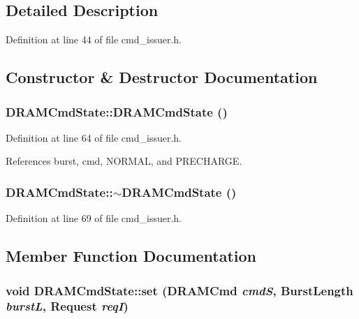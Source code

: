 \subsection{Detailed Description}


Definition at line 44 of file cmd\_\-issuer.h.

\subsection{Constructor \& Destructor Documentation}
\subsubsection[{DRAMCmdState}]{\setlength{\rightskip}{0pt plus 5cm}DRAMCmdState::DRAMCmdState ()\hspace{0.3cm}{\tt  [inline]}}\label{structDRAMCmdState_940294d20ed946530cb2731041c78a40}




Definition at line 64 of file cmd\_\-issuer.h.

References burst, cmd, NORMAL, and PRECHARGE.
\subsubsection[{$\sim$DRAMCmdState}]{\setlength{\rightskip}{0pt plus 5cm}DRAMCmdState::$\sim$DRAMCmdState ()\hspace{0.3cm}{\tt  [inline]}}\label{structDRAMCmdState_ad2f74b8d98b2ed4799d06fb137da995}




Definition at line 69 of file cmd\_\-issuer.h.

\subsection{Member Function Documentation}
\subsubsection[{set}]{\setlength{\rightskip}{0pt plus 5cm}void DRAMCmdState::set ({\bf DRAMCmd} {\em cmdS}, \/  {\bf BurstLength} {\em burstL}, \/  {\bf Request} {\em reqI})\hspace{0.3cm}{\tt  [inline]}}\label{structDRAMCmdState_901fee4ee232a13830c3705ab9c514cc}





